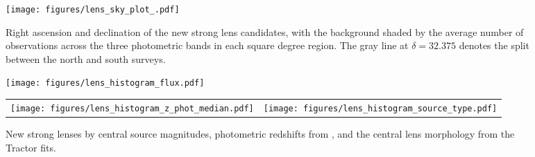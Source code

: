 \documentclass{aastex631}
\begin{document}
\begin{figure*}
    \centering
    \texttt{[image: figures/lens\_sky\_plot\_.pdf]}
    \caption{Right ascension and declination of the new strong lens candidates, with the background shaded by the average number of observations across the three photometric bands in each square degree region. The gray line at $\delta=32.375$ denotes the split between the north and south surveys.}
    \label{fig:sky_plots}
\end{figure*}

\begin{figure*}
    \centering
    \texttt{[image: figures/lens\_histogram\_flux.pdf]}
    \begin{tabular}{p{} p{}}
      \vspace{0pt} \texttt{[image: figures/lens\_histogram\_z\_phot\_median.pdf]} &
      \vspace{0pt} \texttt{[image: figures/lens\_histogram\_source\_type.pdf]}
    \end{tabular}
    \caption{New strong lenses by central source magnitudes, photometric redshifts from \citet{rongpu}, and the central lens morphology from the Tractor fits.}
    \label{fig:histograms}
\end{figure*}
\end{document}
